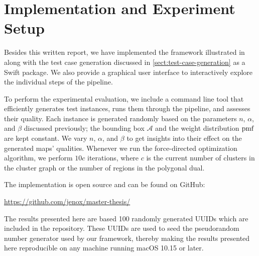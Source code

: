 \section{Implementation and Experiment Setup}
\label{sect:implementation-and-experiment-setup}

Besides this written report, we have implemented the framework illustrated in 
 along with the test case generation discussed in \cref{sect:test-case-generation} as a Swift package.
We also provide a graphical user interface to interactively explore the individual steps of the pipeline.

To perform the experimental evaluation, we include a command line tool that efficiently generates test instances, runs them through the pipeline, and assesses their quality.
Each instance is generated randomly based on the parameters $n$, $\alpha$, and $\beta$ discussed previously; the bounding box $\mathcal{A}$ and the weight distribution $\operatorname{pmf}$ are kept constant.
We vary $n$, $\alpha$, and $\beta$ to get insights into their effect on the generated maps' qualities.
Whenever we run the force-directed optimization algorithm, we perform $10c$ iterations, where $c$ is the current number of clusters in the cluster graph or the number of regions in the polygonal dual.

The implementation is open source and can be found on GitHub:
%
\begin{center}
  \url{https://github.com/jenox/master-thesis/}
\end{center}

The results presented here are based 100 randomly generated UUIDs which are included in the repository.
These UUIDs are used to seed the pseudorandom number generator used by our framework, thereby making the results presented here reproducible on any machine running macOS 10.15 or later.
